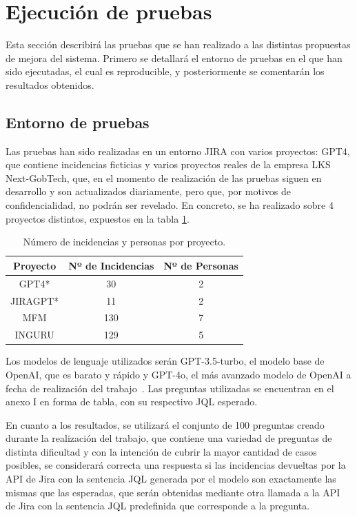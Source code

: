 \section{Ejecución de pruebas}
Esta sección describirá las pruebas que se han realizado a las distintas propuestas de mejora del sistema. Primero se detallará el entorno de pruebas en el que han sido ejecutadas, el cual es reproducible, y posteriormente se comentarán los resultados obtenidos.

\subsection{Entorno de pruebas}
Las pruebas han sido realizadas en un entorno JIRA con varios proyectos: GPT4, que contiene incidencias ficticias y varios proyectos reales de la empresa LKS Next-GobTech, que, en el momento de realización de las pruebas siguen en desarrollo y son actualizados diariamente, pero que, por motivos de confidencialidad, no podrán ser revelado. En concreto, se ha realizado sobre 4 proyectos distintos, expuestos en la tabla \ref{tab:proyectos}.

\begin{table}[h]
\centering
\begin{tabular}{|c|c|c|}
\hline
\textbf{Proyecto} & \textbf{Nº de Incidencias} & \textbf{Nº de Personas} \\
\hline
GPT4* & 30 & 2 \\
\hline
JIRAGPT* & 11 & 2 \\
\hline
MFM & 130 & 7 \\
\hline
INGURU & 129 & 5 \\
\hline
\end{tabular}
\caption{Número de incidencias y personas por proyecto.}
\label{tab:proyectos}
\end{table}

Los modelos de lenguaje utilizados serán GPT-3.5-turbo, el modelo base de OpenAI, que es barato y rápido y GPT-4o, el más avanzado modelo de OpenAI a fecha de realización del trabajo~\cite{gpt4o}. Las preguntas utilizadas se encuentran en el anexo I en forma de tabla, con su respectivo JQL esperado.

En cuanto a los resultados, se utilizará el conjunto de 100 preguntas creado durante la realización del trabajo, que contiene una variedad de preguntas de distinta dificultad y con la intención de cubrir la mayor cantidad de casos posibles, se considerará correcta una respuesta si las incidencias devueltas por la API de Jira con la sentencia JQL generada por el modelo son exactamente las mismas que las esperadas, que serán obtenidas mediante otra llamada a la API de Jira con la sentencia JQL predefinida que corresponde a la pregunta.

